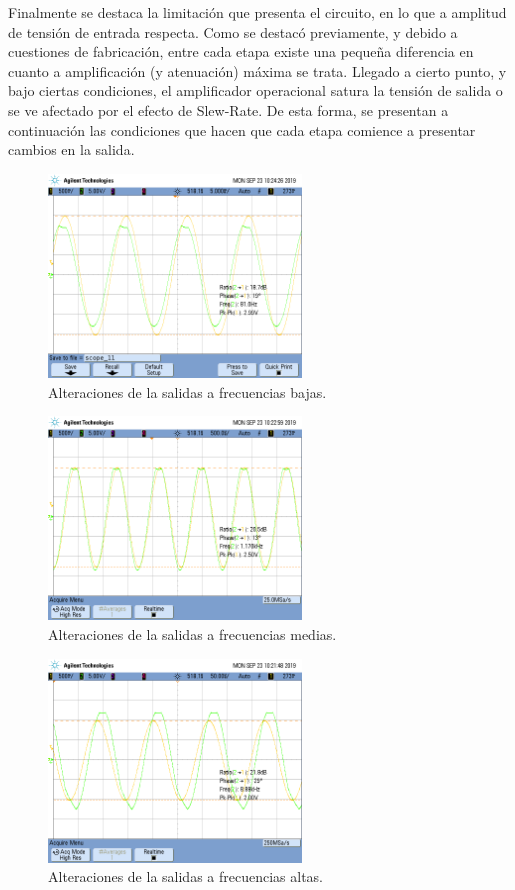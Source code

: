 Finalmente se destaca la limitación que presenta el circuito, en lo que a amplitud de tensión de entrada respecta. Como se destacó previamente, y debido a cuestiones de fabricación, entre cada etapa existe una pequeña diferencia en cuanto a amplificación (y atenuación) máxima se trata. Llegado a cierto punto, y bajo ciertas condiciones, el amplificador operacional satura la tensión de salida o se ve afectado por el efecto de Slew-Rate. De esta forma, se presentan a continuación las condiciones que hacen que cada etapa comience a presentar cambios en la salida.
\begin{figure}[H]	
	\centering
	\includegraphics[width=0.6\textwidth, trim = {0 3.35cm 0 2cm},clip]{Imagenes/F81-3.png}
	\caption{Alteraciones de la salidas a frecuencias bajas.}
	\label{fig:F81-3}
\end{figure}
\begin{figure}[H]	
	\centering
	\includegraphics[width=0.6\textwidth, trim = {0 3.4cm 0 2cm},clip]{Imagenes/F1170-25.png}
	\caption{Alteraciones de la salidas a frecuencias medias.}
	\label{fig:F1170-25}
\end{figure}
\begin{figure}[H]	
	\centering
	\includegraphics[width=0.6\textwidth, trim = {0 3.4cm 0 2cm},clip]{Imagenes/F8890-2.png}
	\caption{Alteraciones de la salidas a frecuencias altas.}
	\label{fig:F8890-2}
\end{figure}

